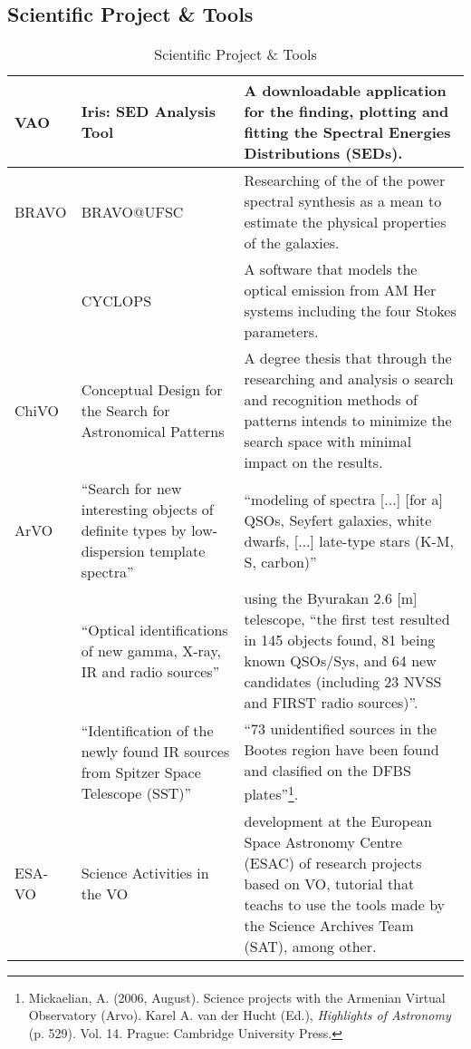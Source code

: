 
\subsection{Scientific Project \& Tools}
\begin{table*}[h!t]
	\centering
	\begin{tabular}{|l|p{4cm}|p{10cm}|}
	\hline
	VAO		& Iris: SED Analysis Tool & A downloadable application for the finding, plotting and fitting the Spectral Energies Distributions (SEDs). \\
	\hline
	BRAVO	& BRAVO@UFSC & Researching of the of the power spectral synthesis as a mean to estimate the physical properties of the galaxies.\\
			& CYCLOPS & A software that models the optical emission from AM Her systems including the four Stokes parameters.\\
	\hline
	ChiVO	& Conceptual Design for the Search for Astronomical Patterns & A degree thesis that through the researching and analysis o search and
							recognition methods of patterns intends to minimize the search space with minimal impact on the results. \\
	\hline
	ArVO	& ``Search for new interesting objects of definite types by low-dispersion template spectra'' & ``modeling of spectra [...] [for a] QSOs,
							Seyfert galaxies, white dwarfs, [...] late-type stars (K-M, S, carbon)'' \\
			& ``Optical identifications of new gamma, X-ray, IR and radio sources'' & using the Byurakan 2.6 [m] telescope, ``the first test resulted in 145 
							objects found, 81 being known QSOs/Sys, and 64 new candidates (including 23 NVSS and FIRST radio sources)''.\\
			& ``Identification of the newly found IR sources from Spitzer Space Telescope (SST)''& ``73 unidentified sources in the Bootes region have been 
							found and clasified on the DFBS plates''\footnote{Mickaelian, A. (2006, August). Science projects with the Armenian Virtual 
							Observatory (Arvo). Karel A.  van der Hucht (Ed.), \textit{Highlights of Astronomy} (p. 529). Vol. 14. Prague: Cambridge 
							University Press.}.\\
	\hline
	ESA-VO	& Science Activities in the VO & development at the European Space Astronomy Centre (ESAC) of research projects based on VO, tutorial that teachs to use the tools made by the Science Archives Team (SAT), among other.\\
	\hline
	\end{tabular}
	\caption{Scientific Project \& Tools}
	\label{table:st}
\end{table*}

